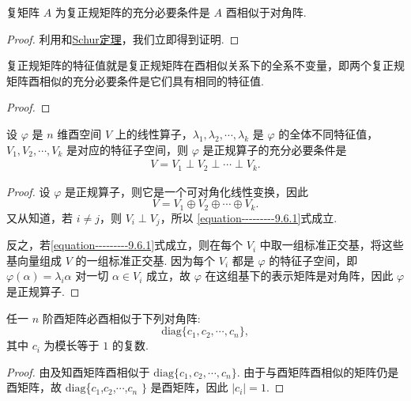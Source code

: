 \documentclass[../../main.tex]{subfiles}
\begin{document}
\begin{theorem}\label{theorem:复正规矩阵等价于酉相似于对角阵的矩阵}
复矩阵 $A$ 为复正规矩阵的充分必要条件是 $A$ 酉相似于对角阵.
\end{theorem}
\begin{proof}
利用和\hyperref[theorem:Schur(舒尔)定理]{Schur定理}，我们立即得到证明.

\end{proof}

\begin{theorem}\label{theorem:复正规矩阵的特征值就是复正规矩阵在酉相似关系下的全系不变量}
复正规矩阵的特征值就是复正规矩阵在酉相似关系下的全系不变量，即两个复正规矩阵酉相似的充分必要条件是它们具有相同的特征值.
\end{theorem}
\begin{proof}


\end{proof}

\begin{proposition}
设 $\varphi$ 是 $n$ 维酉空间 $V$ 上的线性算子，$\lambda_1,\lambda_2,\cdots,\lambda_k$ 是 $\varphi$ 的全体不同特征值，$V_1,V_2,\cdots,V_k$ 是对应的特征子空间，则 $\varphi$ 是正规算子的充分必要条件是
\begin{align}\label{equation---------9.6.1}
V = V_1 \perp V_2 \perp \cdots \perp V_k. 
\end{align}
\end{proposition}
\begin{proof}
设 $\varphi$ 是正规算子，则它是一个可对角化线性变换，因此
\[
V = V_1 \oplus V_2 \oplus \cdots \oplus V_k.
\]
又从知道，若 $i \neq j$，则 $V_i \perp V_j$，所以 \eqref{equation---------9.6.1}式成立.

反之，若\eqref{equation---------9.6.1}式成立，则在每个 $V_i$ 中取一组标准正交基，将这些基向量组成 $V$ 的一组标准正交基. 因为每个 $V_i$ 都是 $\varphi$ 的特征子空间，即 $\varphi(\alpha) = \lambda_i\alpha$ 对一切 $\alpha \in V_i$ 成立，故 $\varphi$ 在这组基下的表示矩阵是对角阵，因此 $\varphi$ 是正规算子. 

\end{proof}

\begin{theorem}
任一 $n$ 阶酉矩阵必酉相似于下列对角阵:
\[
\mathrm{diag}\{c_1,c_2,\cdots,c_n\},
\]
其中 $c_i$ 为模长等于 $1$ 的复数.
\end{theorem}
\begin{proof}
由及知酉矩阵酉相似于 $\mathrm{diag}\{c_1,c_2,\cdots,c_n\}$. 由于与酉矩阵酉相似的矩阵仍是酉矩阵，故 $\mathrm{diag}$\{$c_1$,$c_2$,$\cdots$,$c_n$ $\}$ 是酉矩阵，因此 $|c_i| = 1$.

\end{proof}
\end{document}
